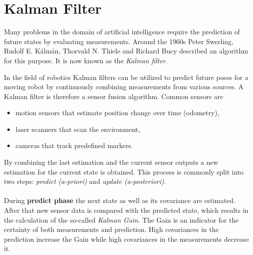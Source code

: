 \section{Kalman Filter}
Many problems in the domain of artificial intelligence require the prediction of future states by evaluating measurements. Around the 1960s Peter Swerling, Rudolf E. Kálmán, Thorvald N. Thiele and Richard Bucy described an algorithm for this purpose. It is now known as the \textit{Kalman filter}.

In the field of robotics Kalman filters can be utilized to predict future poses for a moving robot by continuously combining measurements from various sources. A Kalman filter is therefore a sensor fusion algorithm. Common sensors are
 
\begin{itemize}
\item motion sensors that estimate position change over time (odometry),
\item laser scanners that scan the environment,
\item cameras that track predefined markers. 
\end{itemize}

By combining the last estimation and the current sensor outputs a new estimation for the current state is obtained. This process is commonly split into two steps: \textit{predict (a-priori)} and \textit{update (a-posteriori)}.
\\\\
During \textbf{predict phase} the next state as well as its covariance are estimated. After that new sensor data is compared with the predicted state, which results in the calculation of the so-called  \textit{Kalman Gain}. The Gain is an indicator for the certainty of both measurements and prediction. High covariances in the prediction increase the Gain while high covariances in the measurements decrease it.

